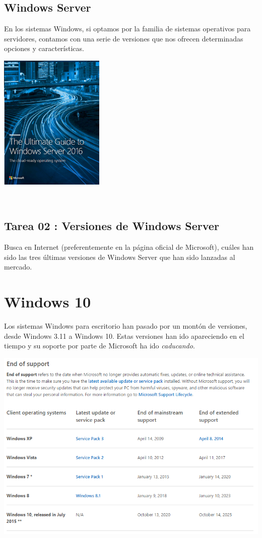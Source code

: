 \documentclass[11pt]{article}
\begin{document}
\subsection{Windows Server}
\label{sec:org2475437}

En los sistemas Windows, si optamos por la familia de sistemas
operativos para servidores, contamos con una serie de versiones que nos
ofrecen determinadas opciones y características.

\begin{center}
\includegraphics[width=5cm]{Versiones/WindowsServer_cover.png}
\end{center}  


\subsection{Tarea 02 : Versiones de Windows Server}
\label{sec:orgf19731a}

Busca en Internet (preferentemente en la página oficial de Microsoft), cuáles han 
sido las tres últimas versiones de Windows Server que han sido lanzadas al mercado.

\newpage
\section{Windows 10}
\label{sec:orga575566}
Los sistemas Windows para escritorio han pasado por un montón de
versiones, desde Windows 3.11 a Windows 10. Estas versiones han ido
apareciendo en el tiempo y su soporte por parte de Microsoft ha ido
\emph{caducando}.

\begin{center}
\includegraphics[width=.9\linewidth]{Versiones/fin-soporte-windows.png}
\end{center}  
\end{document}
